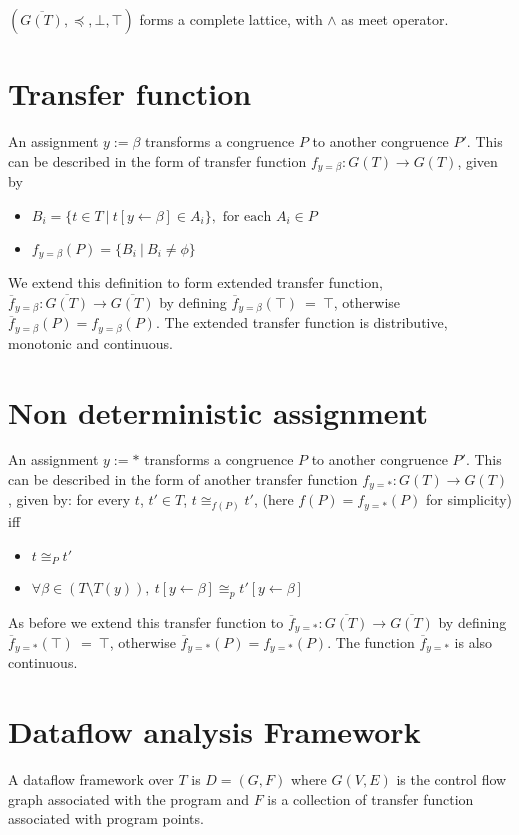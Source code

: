 $(\overline{G(T)}, \preceq, \bot, \top)$ 
forms a complete lattice, with $\land$ as meet operator.

\section{Transfer function}
An assignment $y := \beta$ transforms a congruence $P$ to another 
congruence $P'$. This can be described in the form of transfer 
function $f_{y = \beta}:G(T) \to G(T)$, given by
\begin{itemize}
    \item $B_i = \{t \in T\ |\ t[y \leftarrow \beta] \in A_i\}, \text{ for each } A_i \in P$
    \item $f_{y = \beta}(P) = \{B_i\ | \ B_i \neq \phi\}$
\end{itemize}
We extend this definition to form extended transfer function, 
$\overline{f}_{y=\beta} : \overline{G(T)} \to \overline{G(T)}$ 
by defining $\overline{f}_{y=\beta}(\top)\ =\ \top$, otherwise $\overline{f}_{y=\beta}(P) = f_{y=\beta}(P)$.
The extended transfer function is distributive, monotonic and continuous.

\section{Non deterministic assignment}
An assignment $y := *$ transforms a congruence $P$ to another 
congruence $P'$. This can be described in the form of another 
transfer function $f_{y = *}:G(T) \to G(T)$, given by: 
for every $t$, $t' \in T$, $t \cong_{f(P)} t'$, (here $f(P) = f_{y = *}(P)$ for simplicity) iff
\begin{itemize}
    \item $t \cong_P t'$
    \item $\forall \beta \in (T \setminus T(y)),\ t[y \leftarrow \beta] \cong_p t'[y \leftarrow \beta]$
\end{itemize}
As before we extend this transfer function to 
$\overline{f}_{y=*} : \overline{G(T)} \to \overline{G(T)}$ by defining
$\overline{f}_{y=*}(\top)\ =\ \top$, otherwise 
$\overline{f}_{y=*}(P) = f_{y=*}(P)$. 
The function $\overline{f}_{y=*}$ is also continuous.

\section{Dataflow analysis Framework}
A dataflow framework over $T$ is $D = (G, F)$ where $G(V, E)$ is the 
control flow graph associated with the program and $F$ is a 
collection of transfer function associated with program points.


